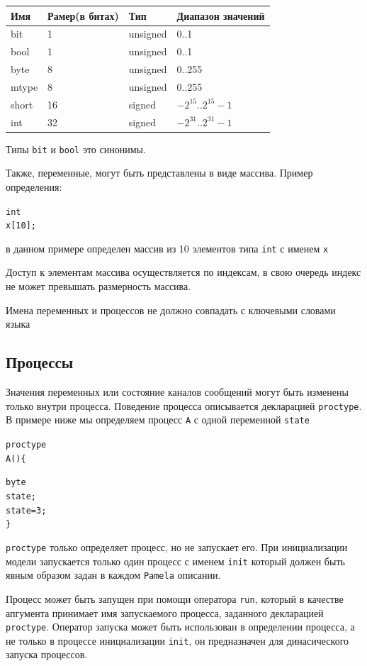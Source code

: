 \documentclass[12pt, twoside]{report}
\newcommand{\cname}[1] {
\textcolor{atnotation}{#1}
}
\begin{document}
\begin{tabular}{l|l|l|l}
  \hline
  Имя   & Рамер(в битах) & Тип & Диапазон значений \\ \hline
  bit   & 1 & unsigned & 0..1 \\ \hline
  bool  & 1 & unsigned & 0..1 \\ \hline
  byte  & 8 & unsigned & 0..255 \\ \hline
  mtype & 8 & unsigned & 0..255 \\ \hline
  short & 16 & signed & $-2^15$..$2^15 - 1$ \\ \hline
  int   & 32 & signed & $-2^31$..$2^31 - 1$ \\ \hline
  \hline
\end{tabular}

Типы \texttt{bit} и \texttt{bool} это синонимы.

Также, переменные, могут быть представлены в виде массива. Пример определения:
\begin{alltt}
\cname{int} x [10];
\end{alltt}
в данном примере определен массив из 10 элементов типа \texttt{int} с именем \texttt{x}

Доступ к элементам массива осуществляется по индексам, в свою очередь индекс не может
превышать размерность массива.

Имена переменных и процессов не должно совпадать с ключевыми словами языка 

\subsection*{Процессы}\label{promela_language_PROCESS}

Значения переменных или состояние каналов сообщений могут быть изменены только внутри процесса.
Поведение процесса описывается декларацией \texttt{proctype}. В примере ниже мы определяем процесс
\texttt{A} с одной переменной \texttt{state}
\begin{alltt}
\cname{proctype} A() \{
  \cname{byte} state;
  state = 3;
\}
\end{alltt}
\texttt{proctype} только определяет процесс, но не запускает его. При инициализации модели
запускается только один процесс с именем \texttt{init} который должен быть явным образом задан в
каждом \texttt{Pamela} описании.

Процесс может быть запущен при помощи оператора \texttt{run}, который в качестве апгумента принимает
имя запускаемого процесса, заданного декларацией \texttt{proctype}. Оператор запуска может быть использован в
определении процесса, а не только в процессе инициализации \texttt{init}, он предназначен для динасического
запуска процессов.
\end{document}
